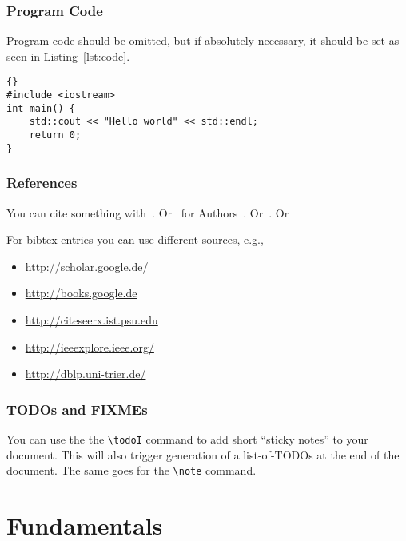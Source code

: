 \subsection{Program Code}

Program code should be omitted, but if absolutely necessary, it should be set as seen in Listing~\ref{lst:code}.

\begin{lstlisting}[caption=Sample application,label=lst:code]{}
#include <iostream>
int main() {
    std::cout << "Hello world" << std::endl;
    return 0;
}

\end{lstlisting}


\subsection{References}

You can cite something with~\cite{Berlin}.
Or~\citeauthor{raake2014quality} for Authors~\cite{raake2014quality}.
Or~\cite{coresparql}. Or \cite[p 1]{sparqlAlgebra}

For bibtex entries you can use different sources, e.g.,
\begin{itemize}
    \item \url{http://scholar.google.de/}
    \item \url{http://books.google.de}
    \item \url{http://citeseerx.ist.psu.edu}
    \item \url{http://ieeexplore.ieee.org/}
    \item \url{http://dblp.uni-trier.de/}
\end{itemize}

\subsection{TODOs and FIXMEs}

You can use the the \verb|\todoI| command to add short ``sticky notes'' to your document.
This will also trigger generation of a list-of-TODOs at the end of the document.
The same goes for the \verb|\note| command.




\chapter{Fundamentals}
\label{sec:fundamentals}

